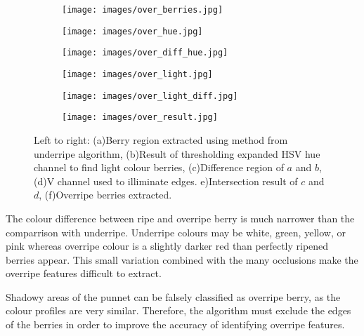 \documentclass[conference]{IEEEtran}
\begin{document}
\begin{figure}[ht]
	\centering
	\begin{subfigure}{.25\textwidth}
		\centering
		\texttt{[image: images/over\_berries.jpg]}
		\caption{}
		\label{fig:over_berries}
	\end{subfigure}%
	\begin{subfigure}{.25\textwidth}
		\centering
		\texttt{[image: images/over\_hue.jpg]}
		\caption{}
		\label{fig:over_hue}
	\end{subfigure}%
	
	\begin{subfigure}{.25\textwidth}
		\centering
		\texttt{[image: images/over\_diff\_hue.jpg]}
		\caption{}
		\label{fig:over_diff}
	\end{subfigure}%
	\begin{subfigure}{.25\textwidth}
		\centering
		\texttt{[image: images/over\_light.jpg]}
		\caption{}
		\label{fig:over_light}
	\end{subfigure}%
	
	\begin{subfigure}{.25\textwidth}
		\centering
		\texttt{[image: images/over\_light\_diff.jpg]}
		\caption{}
		\label{fig:over_light_diff}
	\end{subfigure}%
	\begin{subfigure}{.25\textwidth}
		\centering
		\texttt{[image: images/over\_result.jpg]}
		\caption{}
		\label{fig:over_result}
	\end{subfigure}%
	
	\caption{Left to right: (a)Berry region extracted using method from underripe algorithm, (b)Result of thresholding expanded HSV hue channel to find light colour berries, (c)Difference region of $a$ and $b$, (d)V channel used to illiminate edges. e)Intersection result of $c$ and $d$, (f)Overripe berries extracted.}
	\label{fig:overripe_process}
\end{figure} 

The colour difference between ripe and overripe berry is much narrower than the comparrison with underripe. Underripe colours may be white, green, yellow, or pink whereas overripe colour is a slightly darker red than perfectly ripened berries appear. This small variation combined with the many occlusions make the overripe features difficult to extract.

Shadowy areas of the punnet can be falsely classified as overripe berry, as the colour profiles are very similar. Therefore, the algorithm must exclude the edges of the berries in order to improve the accuracy of identifying overripe features. 
\end{document}
